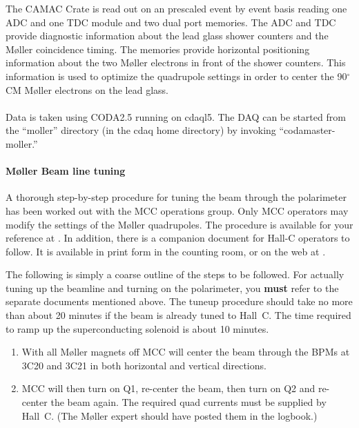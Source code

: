 {The CAMAC Crate is read out on an prescaled event by event basis
reading one ADC and one TDC module and two dual port memories. The ADC
and TDC provide diagnostic information about the lead glass shower
counters and the M\o ller coincidence timing. The memories provide
horizontal positioning information about the two M\o ller electrons in
front of the shower counters. This information is used to optimize the
quadrupole settings in order to center the 90$^{\circ}$ CM M\o ller
electrons on the lead glass. \\ \\ Data is taken using CODA2.5 running
on cdaql5. The DAQ can be started from the ``moller'' directory (in
the cdaq home directory) by invoking ``codamaster-moller.''

\paragraph{M\o ller Beam line tuning}

A thorough step-by-step procedure for tuning the beam through the
polarimeter has been worked out with the MCC operations group. Only
MCC operators may modify the settings of the M\o ller quadrupoles.
The procedure is available for your reference at
. In addition, there is a companion 
document for Hall-C operators to follow. It is available in print form
in the counting room, or on the web at
.

The following is simply a coarse outline of the steps to be followed.
For actually tuning up the beamline and turning on the polarimeter,
you {\bf must} refer to the separate documents mentioned above. The
tuneup procedure should take no more than about 20 minutes if the beam
is already tuned to Hall~C.  The time required to ramp up the
superconducting solenoid is about 10 minutes.
\begin{enumerate}
        \item With all M\o ller magnets off MCC will
           center  the beam through the BPMs at 3C20 and 3C21  in both
           horizontal  and vertical  directions. 

        \item MCC will then turn on Q1, re-center the beam, then turn
	on Q2 and re-center the beam again. The required quad currents
	must be supplied by Hall~C.  (The M\o ller expert should have
	posted them in the logbook.)


\end{enumerate}}
